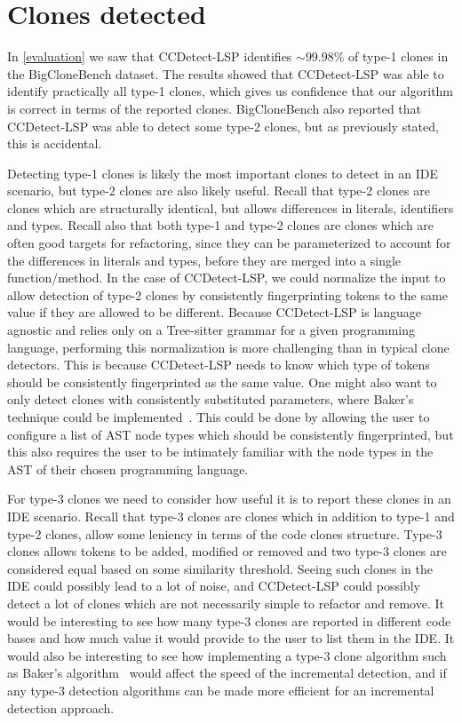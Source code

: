\section{Clones detected}

In \cref{evaluation} we saw that CCDetect-LSP identifies ${\sim}99.98\%$ of type-1 clones in
the BigCloneBench dataset. The results showed that CCDetect-LSP was able to identify
practically all type-1 clones, which gives us confidence that our algorithm is correct in
terms of the reported clones. BigCloneBench also reported that CCDetect-LSP was able to
detect some type-2 clones, but as previously stated, this is accidental.

Detecting type-1 clones is likely the most important clones to detect in an IDE scenario,
but type-2 clones are also likely useful. Recall that type-2 clones are clones which are
structurally identical, but allows differences in literals, identifiers and types. Recall
also that both type-1 and type-2 clones are clones which are often good targets for
refactoring, since they can be parameterized to account for the differences in literals
and types, before they are merged into a single function/method. In the case of
CCDetect-LSP, we could normalize the input to allow detection of type-2 clones by
consistently fingerprinting tokens to the same value if they are allowed to be different.
Because CCDetect-LSP is language agnostic and relies only on a Tree-sitter grammar for a
given programming language, performing this normalization is more challenging than in
typical clone detectors. This is because CCDetect-LSP needs to know which type of tokens
should be consistently fingerprinted as the same value. One might also want to only detect
clones with consistently substituted parameters, where Baker's technique could be
implemented~\cite{Bakerdup}. This could be done by allowing the user to configure a list
of AST node types which should be consistently fingerprinted, but this also requires the
user to be intimately familiar with the node types in the AST of their chosen programming
language.

For type-3 clones we need to consider how useful it is to report these clones in an IDE
scenario. Recall that type-3 clones are clones which in addition to type-1 and type-2
clones, allow some leniency in terms of the code clones structure. Type-3 clones allows
tokens to be added, modified or removed and two type-3 clones are considered equal based
on some similarity threshold. Seeing such clones in the IDE could possibly lead to a lot
of noise, and CCDetect-LSP could possibly detect a lot of clones which are not necessarily
simple to refactor and remove. It would be interesting to see how many type-3 clones are
reported in different code bases and how much value it would provide to the user to list
them in the IDE. It would also be interesting to see how implementing a type-3 clone
algorithm such as Baker's algorithm~\cite{BakerLCS} would affect the speed of the
incremental detection, and if any type-3 detection algorithms can be made more efficient
for an incremental detection approach.
